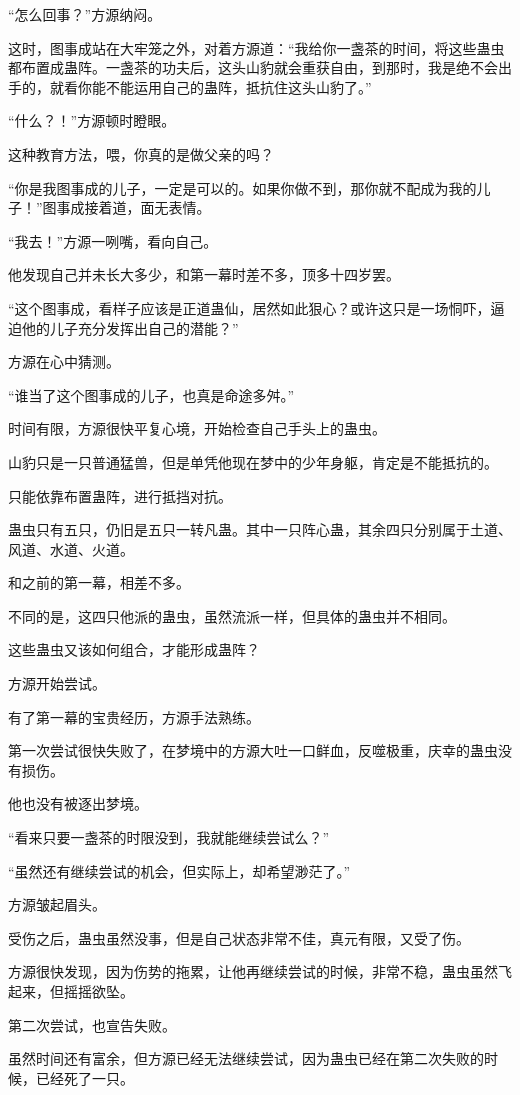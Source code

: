 \begin{this_body}
“怎么回事？”方源纳闷。

这时，图事成站在大牢笼之外，对着方源道：“我给你一盏茶的时间，将这些蛊虫都布置成蛊阵。一盏茶的功夫后，这头山豹就会重获自由，到那时，我是绝不会出手的，就看你能不能运用自己的蛊阵，抵抗住这头山豹了。”

“什么？！”方源顿时瞪眼。

这种教育方法，喂，你真的是做父亲的吗？

“你是我图事成的儿子，一定是可以的。如果你做不到，那你就不配成为我的儿子！”图事成接着道，面无表情。

“我去！”方源一咧嘴，看向自己。

他发现自己并未长大多少，和第一幕时差不多，顶多十四岁罢。

“这个图事成，看样子应该是正道蛊仙，居然如此狠心？或许这只是一场恫吓，逼迫他的儿子充分发挥出自己的潜能？”

方源在心中猜测。

“谁当了这个图事成的儿子，也真是命途多舛。”

时间有限，方源很快平复心境，开始检查自己手头上的蛊虫。

山豹只是一只普通猛兽，但是单凭他现在梦中的少年身躯，肯定是不能抵抗的。

只能依靠布置蛊阵，进行抵挡对抗。

蛊虫只有五只，仍旧是五只一转凡蛊。其中一只阵心蛊，其余四只分别属于土道、风道、水道、火道。

和之前的第一幕，相差不多。

不同的是，这四只他派的蛊虫，虽然流派一样，但具体的蛊虫并不相同。

这些蛊虫又该如何组合，才能形成蛊阵？

方源开始尝试。

有了第一幕的宝贵经历，方源手法熟练。

第一次尝试很快失败了，在梦境中的方源大吐一口鲜血，反噬极重，庆幸的蛊虫没有损伤。

他也没有被逐出梦境。

“看来只要一盏茶的时限没到，我就能继续尝试么？”

“虽然还有继续尝试的机会，但实际上，却希望渺茫了。”

方源皱起眉头。

受伤之后，蛊虫虽然没事，但是自己状态非常不佳，真元有限，又受了伤。

方源很快发现，因为伤势的拖累，让他再继续尝试的时候，非常不稳，蛊虫虽然飞起来，但摇摇欲坠。

第二次尝试，也宣告失败。

虽然时间还有富余，但方源已经无法继续尝试，因为蛊虫已经在第二次失败的时候，已经死了一只。


\end{this_body}
